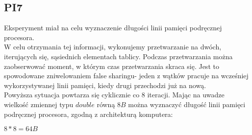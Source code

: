 \documentclass{article}
\begin{document}
\subsection{PI7}
Eksperyment miał na celu wyznaczenie długości linii pamięci podręcznej procesora. \\
W celu otrzymania tej informacji, wykonujemy przetwarzanie na dwóch, iterujących się, sąsiednich elementach tablicy. Podczas przetwarzania można zaobserwować moment, w którym czas przetwarzania skraca się. Jest to spowodowane zniwelowaniem false sharingu- jeden z wątków pracuje na wcześniej wykorzystywanej linii pamięci, kiedy drugi przechodzi już na nową.\\
Powyższa sytuacja powtarza się cyklicznie co 8 iteracji. Mając na uwadze wielkość zmiennej typu $double$ równą $8B$ można wyznaczyć długość linii pamięci podręcznej procesora, zgodną z architekturą komputera:
\begin{center}
    $8 * 8 = 64B$
\end{center}
\end{document}
